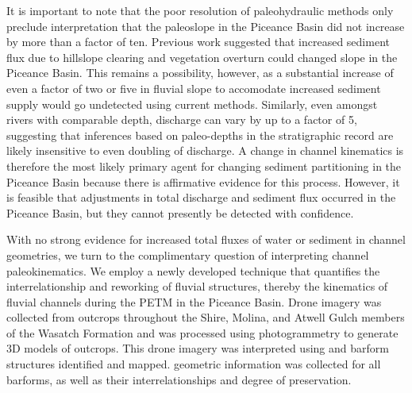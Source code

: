 \documentclass[draft]{compact_proposal}
\begin{document}
It is important to note that the poor resolution of paleohydraulic methods only preclude interpretation that the paleoslope in the Piceance Basin did not increase by more than a factor of ten.
Previous work suggested that increased sediment flux due to hillslope clearing and vegetation overturn could changed slope in the Piceance Basin.
This remains a possibility, however, as a substantial increase of even a factor of two or five in fluvial slope to accomodate increased sediment supply would go undetected using current methods.
Similarly, even amongst rivers with comparable depth,  discharge can vary by up to a factor of 5, suggesting that inferences based on paleo-depths in the stratigraphic record are likely insensitive to even doubling of discharge.
A change in channel kinematics is therefore the most likely primary agent for changing sediment partitioning in the Piceance Basin because there is affirmative evidence for this process.
However, it is feasible that adjustments in total discharge and sediment flux occurred in the Piceance Basin, but they cannot presently be detected with confidence.


With no strong evidence for increased total fluxes of water or sediment in channel geometries, we turn to the complimentary question of interpreting channel paleokinematics.
We employ a newly developed technique that quantifies the interrelationship and reworking of fluvial structures, thereby  the kinematics of fluvial channels during the PETM in the Piceance Basin.
Drone imagery was collected from  outcrops throughout the Shire, Molina, and Atwell Gulch members of the Wasatch Formation and was processed using photogrammetry to generate 3D models of outcrops.
This drone imagery was interpreted using  and barform structures identified and mapped. geometric information was collected for all barforms, as well as their interrelationships and degree of preservation.
\end{document}
